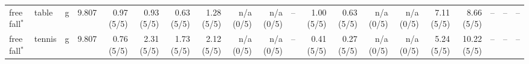 \begin{tabular}{lll r r r r r r r r r r r r r r r r r}
free fall$^\ast$ & table & g & 9.807 & 0.97 (5/5) & 0.93 (5/5) & 0.63 (5/5) & 1.28 (5/5) & n/a (0/5) & n/a (0/5) & -- & 1.00 (5/5) & 0.63 (5/5) & n/a (0/5) & n/a (0/5) & 7.11 (5/5) & 8.66 (5/5) & -- & -- & -- \\
free fall$^\ast$ & tennis & g & 9.807 & 0.76 (5/5) & 2.31 (5/5) & 1.73 (5/5) & 2.12 (5/5) & n/a (0/5) & n/a (0/5) & -- & 0.41 (5/5) & 0.27 (5/5) & n/a (0/5) & n/a (0/5) & 5.24 (5/5) & 10.22 (5/5) & -- & -- & -- \\
\bottomrule
\end{tabular}
